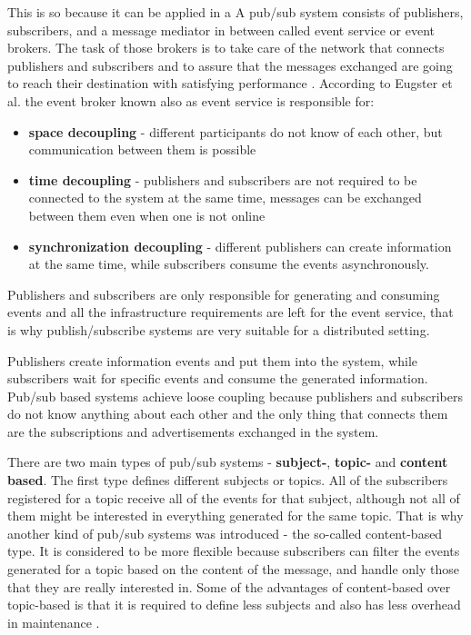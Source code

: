 \documentclass{sigplanconf}
\begin{document}
 This is so because it can be applied in a  A pub/sub system consists of publishers, subscribers, and a message mediator in between called event service or event brokers. The task of those brokers is to take care of the network that connects publishers and subscribers and to assure that the messages exchanged are going to reach their destination with satisfying performance \cite{pubsub1}. According to  Eugster et al. \cite{pubsub4} the event broker known also as event service is responsible for:

\begin{itemize} \itemsep1pt \parskip0pt 
  \item \textbf{space decoupling} - different participants do not know of each other, but communication between them is possible
  \item \textbf{time decoupling} - publishers and subscribers are not required to be connected to the system at the same time, messages can be exchanged between them even when one is not online
  \item \textbf{synchronization decoupling} - different publishers can create information at the same time, while subscribers consume the events asynchronously.
\end{itemize}

Publishers and subscribers are only responsible for generating and consuming events and all the infrastructure requirements are left for the event service, that is why publish/subscribe systems are very suitable for a distributed setting.

Publishers create information events and put them into the system, while subscribers wait for specific events and consume the generated information. Pub/sub based systems achieve loose coupling because publishers and subscribers do not know anything about each other and the only thing that connects them are the subscriptions and advertisements exchanged in the system.

There are two main types of pub/sub systems - \textbf{subject-}, \textbf{topic-} and \textbf{content based}. The first type defines different subjects or topics. All of the subscribers registered for a topic receive all of the events for that subject, although not all of them might be interested in everything generated for the same topic. That is why another kind of pub/sub systems was introduced - the so-called content-based type. It is considered to be more flexible because subscribers can filter the events generated for a topic based on the content of the message, and handle only those that they are really interested in. Some of the advantages of content-based over topic-based is that it is required to define less subjects and also has less overhead in maintenance \cite{pubsuburl}.
\end{document}
